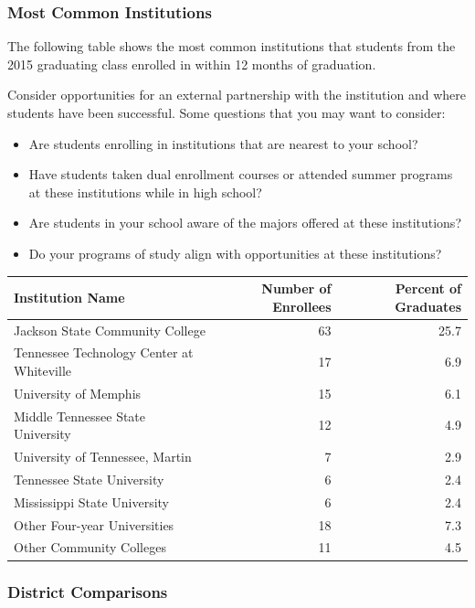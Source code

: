 \documentclass[11pt,]{article}
\providecommand{\tightlist}{%
  \setlength{\itemsep}{0pt}\setlength{\parskip}{0pt}}
\begin{document}
\newpage

\subsubsection{Most Common Institutions}\label{most-common-institutions}

The following table shows the most common institutions that students
from the 2015 graduating class enrolled in within 12 months of
graduation.

Consider opportunities for an external partnership with the institution
and where students have been successful. Some questions that you may
want to consider:

\begin{itemize}
\tightlist
\item
  Are students enrolling in institutions that are nearest to your
  school?
\item
  Have students taken dual enrollment courses or attended summer
  programs at these institutions while in high school?
\item
  Are students in your school aware of the majors offered at these
  institutions?
\item
  Do your programs of study align with opportunities at these
  institutions?
\end{itemize}

\begin{longtable}[]{@{}lrr@{}}
\toprule
Institution Name & Number of Enrollees & Percent of
Graduates\tabularnewline
\midrule
\endhead
Jackson State Community College & 63 & 25.7\tabularnewline
Tennessee Technology Center at Whiteville & 17 & 6.9\tabularnewline
University of Memphis & 15 & 6.1\tabularnewline
Middle Tennessee State University & 12 & 4.9\tabularnewline
University of Tennessee, Martin & 7 & 2.9\tabularnewline
Tennessee State University & 6 & 2.4\tabularnewline
Mississippi State University & 6 & 2.4\tabularnewline
Other Four-year Universities & 18 & 7.3\tabularnewline
Other Community Colleges & 11 & 4.5\tabularnewline
\bottomrule
\end{longtable}

\newpage 

\subsubsection{District Comparisons}\label{district-comparisons-1}
\end{document}
